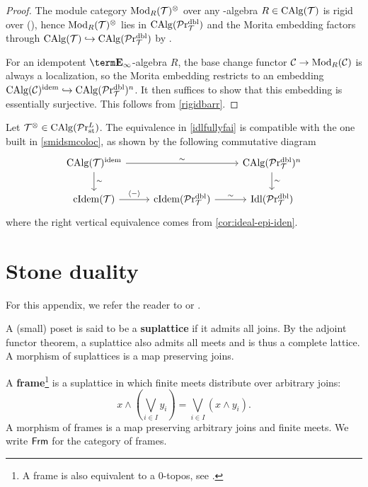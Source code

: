 \documentclass[10pt,a4paper,oneside]{article}
\begin{document}
\begin{proof}

The module category $\operatorname{Mod}_R(\mathcal{T})^\otimes$ over any \ein-algebra $R\in \operatorname{CAlg}(\mathcal{T})$ is rigid over \mct (\cite[Example 4.38]{ramzi2024locally}), hence $\operatorname{Mod}_R(\mathcal{T})^\otimes$ lies in $\operatorname{CAlg}(\mathcal{P}\mathrm{r}_{\mathcal{T}}^{\operatorname{dbl}})$ and the Morita embedding factors through $\operatorname{CAlg}(\mathcal{T})\hookrightarrow \operatorname{CAlg}(\mathcal{P}\mathrm{r}_{\mathcal{T}}^{\operatorname{dbl}})$ by \cite[Observation 4.51]{ramzi2024locally}.

For an idempotent $\einf$-algebra $R$, the base change functor $\mathcal{C}\to \operatorname{Mod}_R(\mathcal{C})$ is always a localization, so the Morita embedding restricts to an embedding $\operatorname{CAlg}(\mathcal{C})^{\operatorname{idem}}\hookrightarrow\operatorname{CAlg}(\mathcal{P}\mathrm{r}_{\mathcal{T}}^{\operatorname{dbl}})^n$. It then suffices to show that this embedding is essentially surjective. This follows from \cref{rigidbarr}.

\end{proof}

\begin{rem}
Let $\mathcal{T}^\otimes\in\operatorname{CAlg}(\mathcal{P}\mathrm{r}_{\operatorname{st}}^L)$. The equivalence in \cref{idlfullyfai} is compatible with the one built in \cref{smidsmcoloc}, as shown by the following commutative diagram
$$
\begin{tikzcd}
\calg(\mct)^{\op{idem}} \arrow[d, "\sim"] \arrow[rr, "\sim"] &                                    & \calg(\lintdbl)^n \arrow[d, "\sim"] \\
\cidemt \arrow[r, "\left<- \right>"]                         & \cidem(\lintdbl) \arrow[r, "\sim"] & \idl(\lintdbl)                     
\end{tikzcd}$$
where the right vertical equivalence comes from \cref{cor:ideal-epi-iden}.
\end{rem}

\appendix
{}
\section{Stone duality}\label{app:stone-duality}
For this appendix, we refer the reader to \cite{Johnstone82} or \cite[Appendix A.1]{sag}.

\begin{de}
A (small) poset is said to be a \textbf{suplattice} if it admits all joins. By the adjoint functor theorem, a suplattice also admits all meets and is thus a complete lattice. A morphism of suplattices is a map preserving joins.
\end{de}

\begin{de}
A \textbf{frame}\footnote{A frame is also equivalent to a $0$-topos, see \cite[.2]{htt}.} is a suplattice in which finite meets distribute over arbitrary joins:
\[
x \wedge (\bigvee_{i\in I}y_i) = \bigvee_{i\in I}(x\wedge y_i).
\]
A morphism of frames is a map preserving arbitrary joins and finite meets. We write $\mathsf{Frm}$ for the category of frames.
\end{de}
\end{document}
